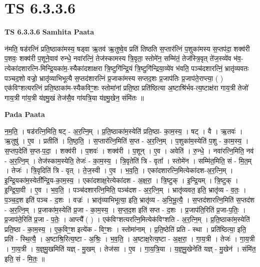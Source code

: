 \documentclass[17pt]{extarticle}
\begin{document}
\section{ TS 6.3.3.6 }

\textbf{TS 6.3.3.6 } \newline
\textbf{Samhita Paata} \newline

न॑मति॒ षड॑रत्निं प्रति॒ष्ठाका॑मस्य॒ षड्वा ऋ॒तव॑ ऋ॒तुष्वे॒व प्रति॑ तिष्ठति स॒प्तार॑त्निं प॒शुका॑मस्य स॒प्तप॑दा॒ शक्व॑री प॒शवः॒ शक्व॑री प॒शूने॒वाव॑ रुन्धे॒ नवा॑रत्निं॒ तेज॑स्कामस्य त्रि॒वृता॒ स्तोमे॑न॒ सम्मि॑तं॒ तेज॑स्त्रि॒वृत् ते॑ज॒स्व्ये॑व भ॑व॒-त्येका॑दशारत्नि-मिन्द्रि॒यका॑म॒-स्यैका॑दशाक्षरा त्रि॒ष्टुगि॑न्द्रि॒यं त्रि॒ष्टुगि॑न्द्रिया॒व्ये॑व भ॑वति॒ पञ्च॑दशारत्निं॒ भ्रातृ॑व्यवतः पञ्चद॒शो वज्रो॒ भ्रातृ॑व्याभिभूत्यै स॒प्तद॑शारत्निं प्र॒जाका॑मस्य सप्तद॒शः प्र॒जाप॑तिः प्र॒जाप॑ते॒राप्त्या॒ ( ) एक॑विꣳशत्यरत्निं प्रति॒ष्ठाका॑म-स्यैकविꣳ॒॒शः स्तोमा॑नां प्रति॒ष्ठा प्रति॑ष्ठित्या अ॒ष्टाश्रि॑र्भव-त्य॒ष्टाक्ष॑रा गाय॒त्री तेजो॑ गाय॒त्री गा॑य॒त्री य॑ज्ञ्मु॒खं तेज॑सै॒व गा॑यत्रि॒या य॑ज्ञ्मु॒खेन॒ संमि॑तः ॥ \newline

\textbf{Pada Paata} \newline

न॒म॒ति॒ । षड॑रत्नि॒मिति॒ षट् - अ॒र॒त्नि॒म् । प्र॒ति॒ष्ठाका॑म॒स्येति॑ प्रति॒ष्ठा- का॒म॒स्य॒ । षट् । वै । ऋ॒तवः॑ । ऋ॒तुषु॑ । ए॒व । प्रतीति॑ । ति॒ष्ठ॒ति॒ । स॒प्तार॑त्नि॒मिति॑ स॒प्त - अ॒र॒त्नि॒म् । प॒शुका॑म॒स्येति॑ प॒शु - का॒म॒स्य॒ । स॒प्तप॒देति॑ स॒प्त-प॒दा॒ । शक्व॑री । प॒शवः॑ । शक्व॑री । प॒शून् । ए॒व । अवेति॑ । रु॒न्धे॒ । नवा॑रत्नि॒मिति॒ नव॑ - अ॒र॒त्नि॒म् । तेज॑स्काम॒स्येति॒ तेजः॑ - का॒म॒स्य॒ । त्रि॒वृतेति॑ त्रि - वृता᳚ । स्तोमे॑न । सम्मि॑त॒मिति॒ सं - मि॒त॒म् । तेजः॑ । त्रि॒वृदिति॑ त्रि - वृत् । ते॒ज॒स्वी । ए॒व । भ॒व॒ति॒ । एका॑दशारत्नि॒मित्येका॑दश-अ॒र॒त्नि॒म् । इ॒न्द्रि॒यका॑म॒स्येती᳚न्द्रि॒य-का॒म॒स्य॒ । एका॑दशाक्ष॒रेत्येका॑दश - अ॒क्ष॒रा॒ । त्रि॒ष्टुक् । इ॒न्द्रि॒यम् । त्रि॒ष्टुक् । इ॒न्द्रि॒या॒वी । ए॒व । भ॒व॒ति॒ । पञ्च॑दशारत्नि॒मिति॒ पञ्च॑दश - अ॒र॒त्नि॒म् । भ्रातृ॑व्यवत॒ इति॒ भ्रातृ॑व्य - व॒तः॒ । प॒ञ्च॒द॒श इति॑ पञ्च - द॒शः । वज्रः॑ । भ्रातृ॑व्याभिभूत्या॒ इति॒ भ्रातृ॑व्य - अ॒भि॒भू॒त्यै॒ । स॒प्तद॑शारत्नि॒मिति॑ स॒प्तद॑श - अ॒र॒त्नि॒म् । प्र॒जाका॑म॒स्येति॑ प्र॒जा - का॒म॒स्य॒ । स॒प्त॒द॒श इति॑ सप्त - द॒शः । प्र॒जाप॑ति॒रिति॑ प्र॒जा-प॒तिः॒ । प्र॒जाप॑ते॒रिति॑ प्र॒जा - प॒तेः॒ । आप्त्यै᳚ ( ) । एक॑विꣳशत्यरत्नि॒मित्येक॑विꣳशति - अ॒र॒त्नि॒म् । प्र॒ति॒ष्ठाका॑म॒स्येति॑ प्रति॒ष्ठा - का॒म॒स्य॒ । ए॒क॒विꣳ॒॒श इत्ये॑क - विꣳ॒॒शः । स्तोमा॑नाम् । प्र॒ति॒ष्ठेति॑ प्रति - स्था । प्रति॑ष्ठित्या॒ इति॒ प्रति॑ - स्थि॒त्यै॒ । अ॒ष्टाश्रि॒रित्य॒ष्टा - अ॒श्रिः॒ । भ॒व॒ति॒ । अ॒ष्टाक्ष॒रेत्य॒ष्टा - अ॒क्ष॒रा॒ । गा॒य॒त्री । तेजः॑ । गा॒य॒त्री । गा॒य॒त्री । य॒ज्ञ्॒मु॒खमिति॑ यज्ञ् - मु॒खम् । तेज॑सा । ए॒व । गा॒य॒त्रि॒या । य॒ज्ञ्॒मु॒खेनेति॑ यज्ञ् - मु॒खेन॑ । संमि॑त॒ इति॒ सं - मि॒तः॒ ॥  \newline
\end{document}
